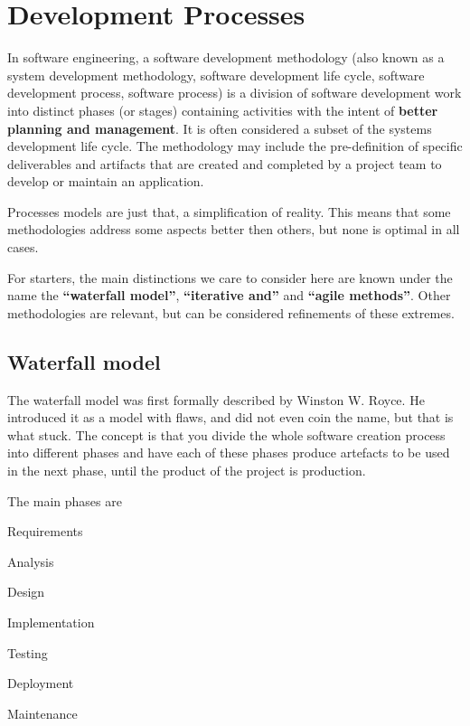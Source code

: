 \section{Development Processes}

In software engineering, a software development methodology (also known
as a system development methodology, software development life cycle,
software development process, software process) is a division of
software development work into distinct phases (or stages) containing
activities with the intent of \textbf{better planning and management}. It is
often considered a subset of the systems development life cycle. The
methodology may include the pre-definition of specific deliverables
and artifacts that are created and completed by a project team to
develop or maintain an application. \cite{wiki:sdp}

Processes models are just that, a simplification of reality. 
This means that some methodologies address some aspects better then
others, but none is optimal in all cases.

For starters, the main distinctions we care to consider here are known under the
name the \textbf{``waterfall model''}, \textbf{``iterative and''} and  \textbf{``agile methods''}.
Other methodologies are relevant, but can be considered refinements of
these extremes.

\subsection{Waterfall model}

The waterfall model was first formally described by Winston W. Royce.
He introduced it as a model with flaws, and did not even coin the
name, but that is what stuck. 
The concept is that you divide the whole software creation process
into different phases and have each of these phases produce artefacts to be
used in the next phase, until the product of the project is
production.

The main phases are
\begin{multicols}{2}
  \begin{enumerate*}
  \item Requirements
  \item Analysis
  \item Design
  \item Implementation
  \item Testing
  \item Deployment
  \item Maintenance
  \end{enumerate*}
\end{multicols}

